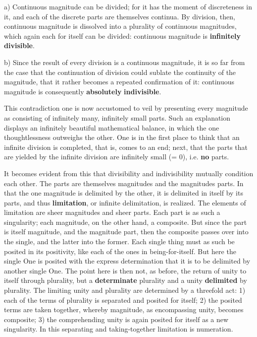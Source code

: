 \documentclass[12pt,a4paper,openany]{book}
\newcommand{\opage}[1]{\marginnote{\footnotesize\textit{[#1]}}}
\begin{document}
a) Continuous magnitude can be divided; for it
has the moment of discreteness in it, and each of the discrete
parts are themselves continua. By division, then,
continuous magnitude is dissolved into a plurality of continuous magnitudes, which again each for itself can be divided:
continuous magnitude is \textbf{infinitely divisible}.

b) Since the result of every division is a continuous magnitude, it is so far from the case that the continuation of division
could sublate the continuity of the magnitude,
that it rather becomes a repeated confirmation
of it: continuous magnitude is consequently \textbf{absolutely}
\textbf{indivisible}.

This contradiction one is now accustomed to veil
by presenting every magnitude as consisting of
infinitely many, infinitely small parts. Such an explanation
displays an infinitely beautiful mathematical balance,
in which the one thoughtlessness outweighs the other. One is in the first place to think that an infinite division is completed, that is, comes to an end; next, that the
parts that are yielded by the infinite division are
infinitely small (= 0), i.e. \textbf{no} parts.

It becomes evident from this that divisibility and
indivisibility mutually condition each other. The parts are
themselves magnitudes and the magnitudes parts. In that the
one magnitude is delimited by the other, it is delimited in itself by
its parts, and thus \textbf{limitation},
or infinite delimitation, is realized.
\setcounter{footnote}{0}%
\opage{31}The elements of limitation are sheer magnitudes and
sheer parts. Each part is as such a singularity;
each magnitude, on the other hand, a composite. But since the part
is itself magnitude, and the magnitude part, then
the composite passes over into the single, and the latter into the former. %
Each single thing must as such be posited in its positivity,
like each of the ones in being-for-itself. But
here the single One is posited with the express determination that it is to be delimited by another single
One. The point here is then not, as before, the return of unity
to itself through plurality,
but a \textbf{determinate} plurality and a unity \textbf{delimited} by plurality. The limiting unity and plurality
are determined by a threefold act: 1) each of
the terms of plurality is separated and posited for itself; 2) the posited
terms are taken together, whereby magnitude, as encompassing
unity, becomes composite; 3) the comprehending
unity is again posited for itself as a new
singularity. In this separating and taking-together
limitation is numeration.
\end{document}
